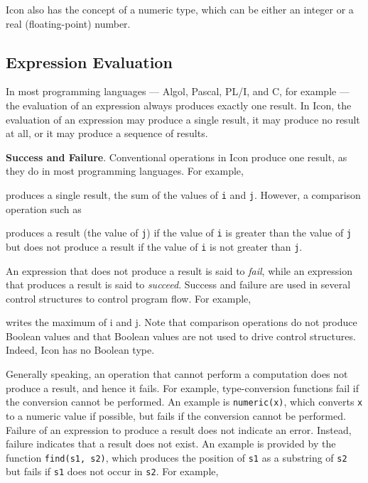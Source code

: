 Icon also has the concept of a numeric type, which can be either an
integer or a real (floating-point) number.


\subsection{Expression Evaluation}

In most programming languages --- Algol, Pascal, PL/I, and C, for
example --- the evaluation of an expression always produces exactly
one result. In Icon, the evaluation of an expression may produce a
single result, it may produce no result at all, or it may produce a
sequence of results.

\textbf{Success and Failure}. Conventional operations in Icon
produce one result, as they do in most programming languages. For
example,


\noindent produces a single result, the sum of the values of \texttt{i} and
\texttt{j}. However, a comparison operation such as


\noindent produces a result (the value of \texttt{j}) if the value of
\texttt{i} is greater than the value of \texttt{j} but does not produce
a result if the value of \texttt{i} is not greater than \texttt{j}.

An expression that does not produce a result is said to \textit{fail},
while an expression that produces a result is said to
\textit{succeed}. Success and failure are used in several control
structures to control program flow. For example,


\noindent writes the maximum of i and j. Note that comparison
operations do not produce Boolean values and that Boolean values are
not used to drive control structures. Indeed, Icon has no Boolean
type.

Generally speaking, an operation that cannot perform a computation
does not produce a result, and hence it fails. For example,
type-conversion functions fail if the conversion cannot be
performed. An example is \texttt{numeric(x)}, which converts
\texttt{x} to a numeric value if possible, but fails if the conversion
cannot be performed. Failure of an expression to produce a result does
not indicate an error. Instead, failure indicates that a result does
not exist. An example is provided by the function \texttt{find(s1, s2)},
which produces the position of \texttt{s1} as a substring of \texttt{s2}
but fails if \texttt{s1} does not occur in \texttt{s2}.  For example,

